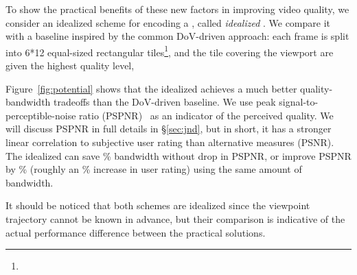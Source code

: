 To show the practical benefits of these new factors in improving video quality, we consider an idealized scheme for encoding a \vrvideo, called {\em idealized \vrvideo}.
We compare it with a baseline inspired by the common DoV-driven approach: each frame is split into 
6*12 equal-sized rectangular tiles\footnote{}, and the tile covering the viewport are given the highest quality level, 

Figure~\ref{fig:potential} shows that the idealized \vrvideo achieves a much better quality-bandwidth tradeoffs than the DoV-driven baseline.
We use peak signal-to-perceptible-noise ratio (PSPNR)~\cite{??} as an indicator of the perceived quality. 
We will discuss PSPNR in full details in \S\ref{sec:jnd}, but in short, it has a stronger linear correlation to subjective user rating than alternative measures (\eg PSNR).
The idealized \vrvideo can save \fillme\% bandwidth without drop in PSPNR, or improve PSPNR by \fillme\% (roughly an \fillme\% increase in user rating) using the same amount of bandwidth.

It should be noticed that both schemes are idealized since the viewpoint trajectory cannot be known in advance, but their comparison is indicative of the actual performance difference between the practical solutions. 


